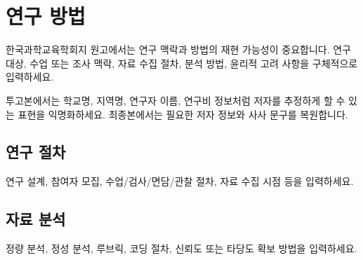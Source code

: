 \section{연구 방법}

한국과학교육학회지 원고에서는 연구 맥락과 방법의 재현 가능성이 중요합니다. 연구 대상, 수업 또는 조사 맥락, 자료 수집 절차, 분석 방법, 윤리적 고려 사항을 구체적으로 입력하세요.

투고본에서는 학교명, 지역명, 연구자 이름, 연구비 정보처럼 저자를 추정하게 할 수 있는 표현을 익명화하세요. 최종본에서는 필요한 저자 정보와 사사 문구를 복원합니다.

\subsection{연구 절차}

연구 설계, 참여자 모집, 수업/검사/면담/관찰 절차, 자료 수집 시점 등을 입력하세요.

\subsection{자료 분석}

정량 분석, 정성 분석, 루브릭, 코딩 절차, 신뢰도 또는 타당도 확보 방법을 입력하세요.
